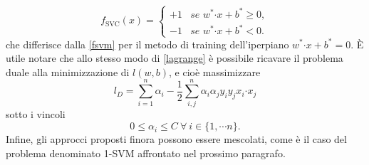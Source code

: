 \documentclass [11pt,a4paper,twoside,openright] {book}
\begin{document}
\begin{equation}
f_\mathrm{SVC}(x)=
\begin{cases}
+1 & \textit{se } w^* \boldsymbol{\cdot} x + b^* \geq 0, \\
-1 & \textit{se } w^* \boldsymbol{\cdot} x  + b^*< 0.
\end{cases}
\end{equation}
che differisce dalla \ref{fsvm} per il metodo di training dell'iperpiano $w^* \boldsymbol{\cdot} x + b^* = 0$.
È utile notare che allo stesso modo di \ref{lagrange} è possibile ricavare il problema duale alla minimizzazione di $l(w,b)$, e cioè massimizzare
\begin{equation}\label{lossduale}
l_D = \sum_{i=1}^n \alpha_i -\dfrac{1}{2} \sum_{i,j}^n \alpha_i \alpha_j y_i y_j x_i \boldsymbol{\cdot} x_j
\end{equation}
sotto i vincoli
\begin{equation}
0 \leq \alpha_i \leq C \: \forall \: i \in \lbrace 1, \cdots n \rbrace.
\end{equation}
Infine, gli approcci proposti finora possono essere mescolati, come è il caso del problema denominato 1-SVM affrontato nel prossimo paragrafo.
\end{document}
